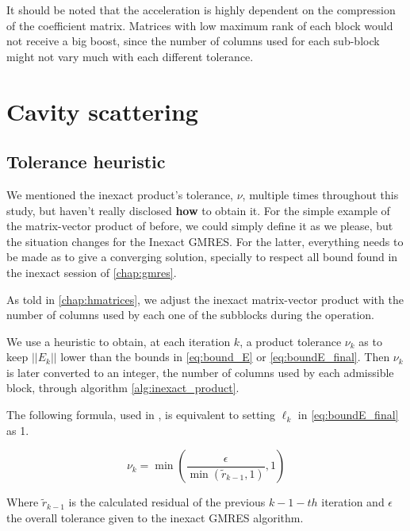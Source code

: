 
It should be noted that the acceleration is highly dependent on the compression of the coefficient matrix. Matrices with low maximum rank of each block would not receive a big boost, since the number of columns used for each sub-block might not vary much with each different tolerance.



\section{Cavity scattering}

\subsection{Tolerance heuristic}

We mentioned the inexact product's tolerance, $\nu$, multiple times throughout this study, but haven't really disclosed \textbf{how} to obtain it. For the simple example of the matrix-vector product of before, we could simply define it as we please, but the situation changes for the Inexact GMRES. For the latter, everything needs to be made as to give a converging solution, specially to respect all bound found in the inexact session of \autoref{chap:gmres}.

As told in \autoref{chap:hmatrices}, we adjust the inexact matrix-vector product with the number of columns used by each one of the subblocks during the operation.

We use a heuristic to obtain, at each iteration $k$, a product tolerance $\nu_{k}$ as to keep $||E_{k}||$ lower than the bounds in \autoref{eq:bound_E} or \autoref{eq:boundE_final}. Then $\nu_{k}$ is later converted to an integer, the number of columns used by each admissible block, through algorithm \ref{alg:inexact_product}.

The following formula, used in \cite{wang2016inexactkryloviterationsrelaxation}, is equivalent to setting $\ell_{k}$ in \autoref{eq:boundE_final} as 1.

\begin{equation}\label{eq:gen_heuristics}
    \nu_{k} = \min \left(\frac{\epsilon}{\min(\tilde{r}_{k-1},1)},1 \right)
\end{equation}

Where $\tilde{r}_{k-1}$ is the calculated residual of the previous $k-1-th$ iteration and $\epsilon$ the overall tolerance given to the inexact GMRES algorithm.

